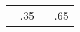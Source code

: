 \vspace*{\fill}

\begingroup
\centering
{}
{
  \begin{tabularx}{.77\paperheight} {
    >{\hsize=.35\hsize\centering\arraybackslash}X 
    >{\hsize=.65\hsize\centering\arraybackslash}X }
    \large\textbf{\authorname{}} & \large\textbf{\doctitlebrazilian{}} \\
  \end{tabularx}
}\par
\endgroup

\vspace*{\fill}

\begin{center}
\large \textbf{\thesisyear{}}
\end{center}
